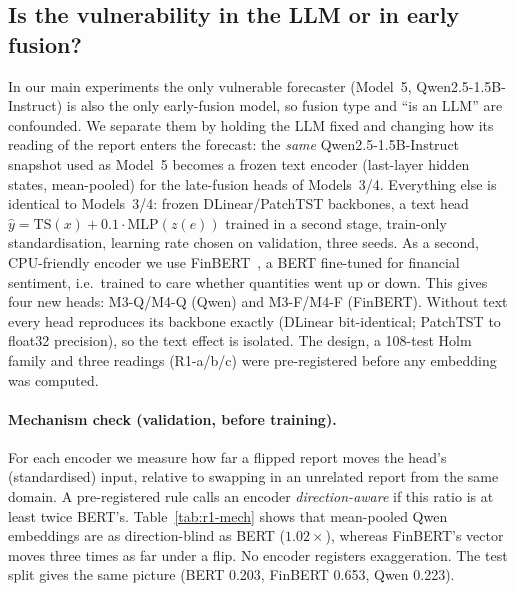 
\subsection{Is the vulnerability in the LLM or in early fusion?}
\label{sec:r1}

In our main experiments the only vulnerable forecaster (Model~5, Qwen2.5-1.5B-Instruct) is
also the only early-fusion model, so fusion type and ``is an LLM'' are confounded. We separate
them by holding the LLM fixed and changing how its reading of the report enters the forecast:
the \emph{same} Qwen2.5-1.5B-Instruct snapshot used as Model~5 becomes a frozen text encoder
(last-layer hidden states, mean-pooled) for the late-fusion heads of Models~3/4. Everything
else is identical to Models~3/4: frozen DLinear/PatchTST backbones, a text head
$\hat y = \mathrm{TS}(x) + 0.1\cdot\mathrm{MLP}(z(e))$ trained in a second stage, train-only
standardisation, learning rate chosen on validation, three seeds. As a second, CPU-friendly
encoder we use FinBERT~\cite{araci2019finbert}, a BERT fine-tuned for financial sentiment, i.e.\
trained to care whether quantities went up or down. This gives four new heads:
M3-Q/M4-Q (Qwen) and M3-F/M4-F (FinBERT). Without text every head reproduces its backbone
exactly (DLinear bit-identical; PatchTST to float32 precision), so the text effect is isolated.
The design, a 108-test Holm family and three readings (R1-a/b/c) were pre-registered before any
embedding was computed.

\paragraph{Mechanism check (validation, before training).}
For each encoder we measure how far a flipped report moves the head's (standardised) input,
relative to swapping in an unrelated report from the same domain. A pre-registered rule calls
an encoder \emph{direction-aware} if this ratio is at least twice BERT's.
Table~\ref{tab:r1-mech} shows that mean-pooled Qwen embeddings are as direction-blind as BERT
($1.02\times$), whereas FinBERT's vector moves three times as far under a flip. No encoder
registers exaggeration. The test split gives the same picture (BERT 0.203, FinBERT 0.653,
Qwen 0.223).

